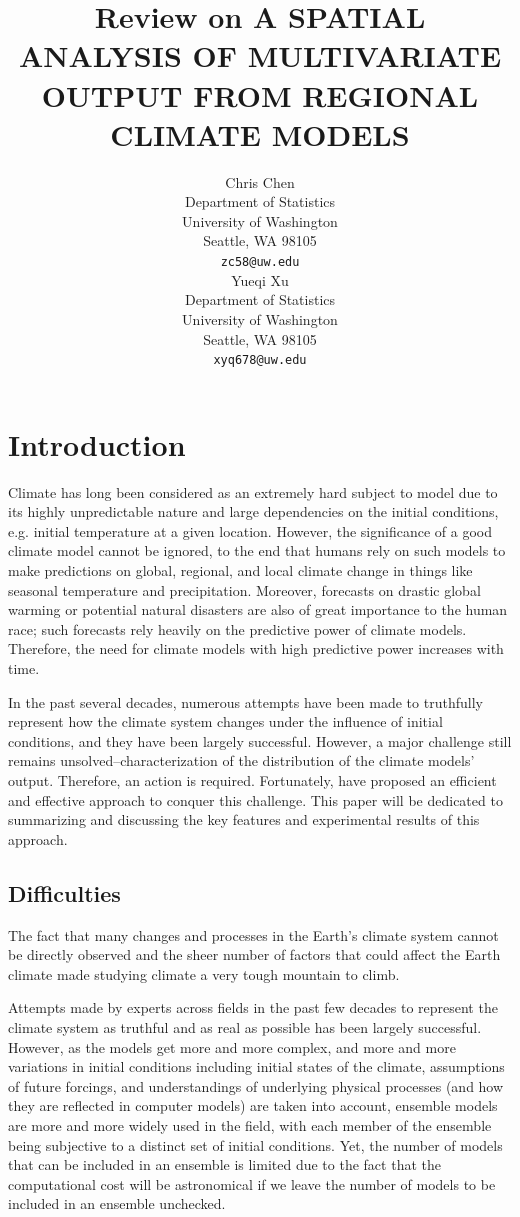 \documentclass{article}
\title{Review on A SPATIAL ANALYSIS OF MULTIVARIATE OUTPUT FROM REGIONAL CLIMATE MODELS}
\author{
  Chris Chen \\
  Department of Statistics\\
  University of Washington\\
  Seattle, WA 98105 \\
  \texttt{zc58@uw.edu} \\
  \And
  Yueqi Xu \\
  Department of Statistics\\
  University of Washington\\
  Seattle, WA 98105 \\
  \texttt{xyq678@uw.edu} 
}
\begin{document}
\maketitle

\section{Introduction}
Climate has long been considered as an extremely hard subject to model due to its highly unpredictable nature and large dependencies on the initial conditions, e.g. initial temperature at a given location. However, the significance of a good climate model cannot be ignored, to the end that humans rely on such models to make predictions on global, regional, and local climate change in things like seasonal temperature and precipitation. Moreover, forecasts on drastic global warming or potential natural disasters are also of great importance to the human race; such forecasts rely heavily on the predictive power of climate models. Therefore, the need for climate models with high predictive power increases with time. 

In the past several decades, numerous attempts have been made to truthfully represent how the climate system changes under the influence of initial conditions, and they have been largely successful. However, a major challenge still remains unsolved--characterization of the distribution of the climate models' output. Therefore, an action is required. Fortunately, \cite{paper} have proposed an efficient and effective approach to conquer this challenge. This paper will be dedicated to summarizing and discussing the key features and experimental results of this approach. 

\subsection{Difficulties}
The fact that many changes and processes in the Earth's climate system cannot be directly observed and the sheer number of factors that could affect the Earth climate made studying climate a very tough mountain to climb. 

Attempts made by experts across fields in the past few decades to represent the climate system as truthful and as real as possible has been largely successful. However, as the models get more and more complex, and more and more variations in initial conditions including initial states of the climate, assumptions of future forcings, and understandings of underlying physical processes (and how they are reflected in computer models) are taken into account, ensemble models are more and more widely used in the field, with each member of the ensemble being subjective to a distinct set of initial conditions. Yet, the number of models that can be included in an ensemble is limited due to the fact that the computational cost will be astronomical if we leave the number of models to be included in an ensemble unchecked. 
\end{document}
